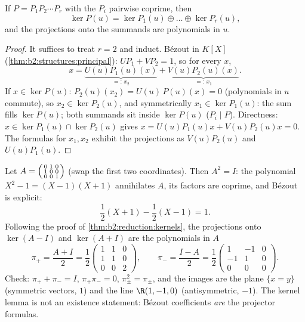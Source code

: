 \begin{theorem}\label{thm:b2:reduction:kernels}
If $P = P_1 P_2 \cdots P_r$ with the $P_i$ pairwise coprime,
then
\[
\ker P(u) = \ker P_1(u) \oplus \dots \oplus \ker P_r(u),
\]
and the projections onto the summands are polynomials in $u$.
\end{theorem}

\begin{proof}
It suffices to treat $r = 2$ and induct. Bézout in $K[X]$
(\cref{thm:b2:structures:principal}): $U P_1 + V P_2 = 1$, so for
every $x$,
\[
x = \underbrace{U(u)P_1(u)(x)}_{=:\,x_2}
+ \underbrace{V(u)P_2(u)(x)}_{=:\,x_1}.
\]
If $x \in \ker P(u)$: $P_2(u)(x_2) = U(u)\,P(u)(x) = 0$ (polynomials
in $u$ commute), so $x_2 \in \ker P_2(u)$, and symmetrically $x_1
\in \ker P_1(u)$: the sum fills $\ker P(u)$; both summands sit
inside $\ker P(u)$ ($P_i \mid P$). Directness: $x \in \ker P_1(u)
\cap \ker P_2(u)$ gives $x = U(u)P_1(u)x + V(u)P_2(u)x = 0$. The
formulas for $x_1, x_2$ exhibit the projections as $V(u)P_2(u)$ and
$U(u)P_1(u)$.
\end{proof}

\begin{example}\label{ex:b2:reduction:projectorswork}
Let $A = \begin{psmallmatrix}0 & 1 & 0\\ 1 & 0 & 0\\ 0 & 0 &
1\end{psmallmatrix}$ (swap the first two coordinates). Then $A^2
= I$: the polynomial $X^2 - 1 = (X - 1)(X + 1)$ annihilates $A$,
its factors are coprime, and B\'ezout is explicit:
\[
\frac{1}{2}(X + 1) - \frac12(X - 1) = 1 .
\]
Following the proof of \cref{thm:b2:reduction:kernels}, the
projections onto $\ker(A - I)$ and $\ker(A + I)$ are the
polynomials in $A$
\[
\pi_+ = \frac{A + I}{2} = \frac12\begin{pmatrix}
1 & 1 & 0\\ 1 & 1 & 0\\ 0 & 0 & 2\end{pmatrix},
\qquad
\pi_- = \frac{I - A}{2} = \frac12\begin{pmatrix}
1 & -1 & 0\\ -1 & 1 & 0\\ 0 & 0 & 0\end{pmatrix}.
\]
Check: $\pi_+ + \pi_- = I$, $\pi_+\pi_- = 0$, $\pi_\pm^2 =
\pi_\pm$, and the images are the plane $\{x = y\}$ (symmetric
vectors,  $1$) and the line $\R(1, -1, 0)$
(antisymmetric,  $-1$). The kernel lemma is not an
existence statement: B\'ezout coefficients \emph{are} the
projector formulas.
\end{example}


